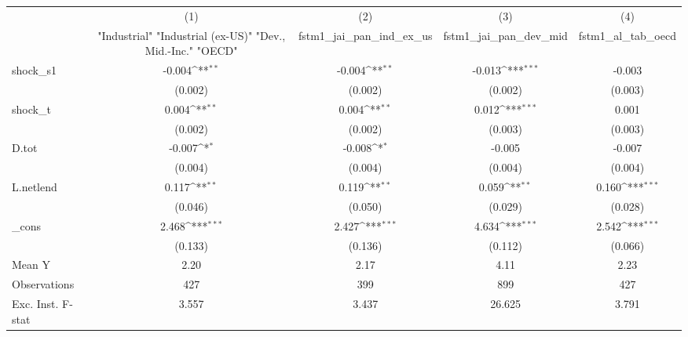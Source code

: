 {
\def\sym#1{\ifmmode^{#1}\else\(^{#1}\)\fi}
\begin{tabular}{l*{4}{c}}
\toprule
            &\multicolumn{1}{c}{(1)}&\multicolumn{1}{c}{(2)}&\multicolumn{1}{c}{(3)}&\multicolumn{1}{c}{(4)}\\
            &\multicolumn{1}{c}{ "Industrial" "Industrial (ex-US)" "Dev., Mid.-Inc." "OECD" }&\multicolumn{1}{c}{fstm1\_jai\_pan\_ind\_ex\_us}&\multicolumn{1}{c}{fstm1\_jai\_pan\_dev\_mid}&\multicolumn{1}{c}{fstm1\_al\_tab\_oecd}\\
\midrule
shock\_s1    &      -0.004\sym{**} &      -0.004\sym{**} &      -0.013\sym{***}&      -0.003         \\
            &     (0.002)         &     (0.002)         &     (0.002)         &     (0.003)         \\
\addlinespace
shock\_t     &       0.004\sym{**} &       0.004\sym{**} &       0.012\sym{***}&       0.001         \\
            &     (0.002)         &     (0.002)         &     (0.003)         &     (0.003)         \\
\addlinespace
D.tot       &      -0.007\sym{*}  &      -0.008\sym{*}  &      -0.005         &      -0.007         \\
            &     (0.004)         &     (0.004)         &     (0.004)         &     (0.004)         \\
\addlinespace
L.netlend   &       0.117\sym{**} &       0.119\sym{**} &       0.059\sym{**} &       0.160\sym{***}\\
            &     (0.046)         &     (0.050)         &     (0.029)         &     (0.028)         \\
\addlinespace
\_cons      &       2.468\sym{***}&       2.427\sym{***}&       4.634\sym{***}&       2.542\sym{***}\\
            &     (0.133)         &     (0.136)         &     (0.112)         &     (0.066)         \\
\midrule
Mean Y      &        2.20         &        2.17         &        4.11         &        2.23         \\
Observations&         427         &         399         &         899         &         427         \\
Exc. Inst. F-stat&       3.557         &       3.437         &      26.625         &       3.791         \\
\bottomrule
\end{tabular}
}
